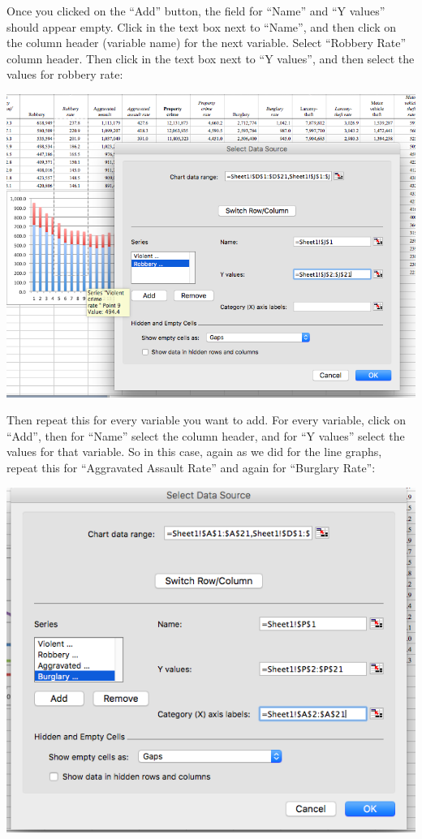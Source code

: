 \documentclass[
]{book}
\begin{document}
Once you clicked on the ``Add'' button, the field for ``Name'' and ``Y values'' should appear empty. Click in the text box next to ``Name'', and then click on the column header (variable name) for the next variable. Select ``Robbery Rate'' column header. Then click in the text box next to ``Y values'', and then select the values for robbery rate:

\includegraphics{imgs/stackedbar_5.png}

Then repeat this for every variable you want to add. For every variable, click on ``Add'', then for ``Name'' select the column header, and for ``Y values'' select the values for that variable. So in this case, again as we did for the line graphs, repeat this for ``Aggravated Assault Rate'' and again for ``Burglary Rate'':

\includegraphics{imgs/comp_c_5.png}
\end{document}
